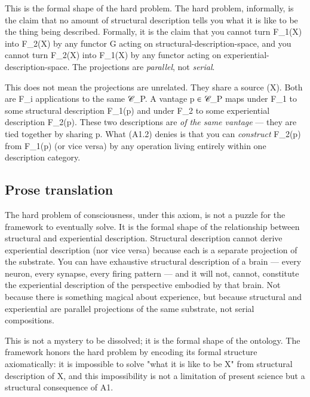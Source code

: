 \documentclass[11pt, openany]{book}
\begin{document}
This is the formal shape of the hard problem. The hard problem, informally, is the claim that no amount of structural description tells you what it is like to be the thing being described. Formally, it is the claim that you cannot turn F\_\allowbreak{}1(X) into F\_\allowbreak{}2(X) by any functor G acting on structural-description-space, and you cannot turn F\_\allowbreak{}2(X) into F\_\allowbreak{}1(X) by any functor acting on experiential-description-space. The projections are \textit{parallel}, not \textit{serial}.

This does not mean the projections are unrelated. They share a source (X). Both are F\_\allowbreak{}i applications to the same 𝒞\_\allowbreak{}P. A vantage p ∈ 𝒞\_\allowbreak{}P maps under F\_\allowbreak{}1 to some structural description F\_\allowbreak{}1(p) and under F\_\allowbreak{}2 to some experiential description F\_\allowbreak{}2(p). These two descriptions are \textit{of the same vantage} --- they are tied together by sharing p. What (A1.2) denies is that you can \textit{construct} F\_\allowbreak{}2(p) from F\_\allowbreak{}1(p) (or vice versa) by any operation living entirely within one description category.

\subsection{Prose translation}

The hard problem of consciousness, under this axiom, is not a puzzle for the framework to eventually solve. It is the formal shape of the relationship between structural and experiential description. Structural description cannot derive experiential description (nor vice versa) because each is a separate projection of the substrate. You can have exhaustive structural description of a brain --- every neuron, every synapse, every firing pattern --- and it will not, cannot, constitute the experiential description of the perspective embodied by that brain. Not because there is something magical about experience, but because structural and experiential are parallel projections of the same substrate, not serial compositions.

This is not a mystery to be dissolved; it is the formal shape of the ontology. The framework honors the hard problem by encoding its formal structure axiomatically: it is impossible to solve "what it is like to be X" from structural description of X, and this impossibility is not a limitation of present science but a structural consequence of A1.
\end{document}

